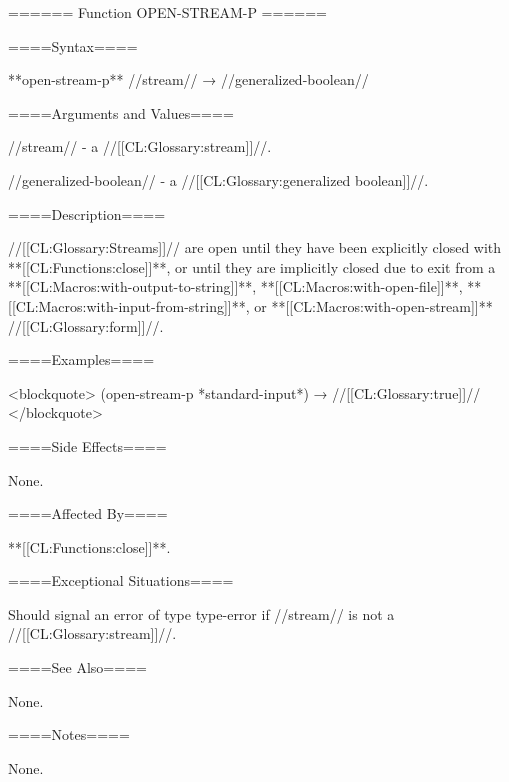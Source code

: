====== Function OPEN-STREAM-P ======

====Syntax====

**open-stream-p** //stream// → //generalized-boolean//

====Arguments and Values====

//stream// - a //[[CL:Glossary:stream]]//.

//generalized-boolean// - a //[[CL:Glossary:generalized boolean]]//.

====Description====


//[[CL:Glossary:Streams]]// are open until they have been explicitly closed with **[[CL:Functions:close]]**, or until they are implicitly closed due to exit from a **[[CL:Macros:with-output-to-string]]**, **[[CL:Macros:with-open-file]]**, **[[CL:Macros:with-input-from-string]]**, or **[[CL:Macros:with-open-stream]]** //[[CL:Glossary:form]]//.

====Examples====

<blockquote> (open-stream-p *standard-input*) → //[[CL:Glossary:true]]// </blockquote>

====Side Effects====

None.

====Affected By====

**[[CL:Functions:close]]**.

====Exceptional Situations====

Should signal an error of type type-error if //stream// is not a //[[CL:Glossary:stream]]//.

====See Also====

None.

====Notes====

None.


